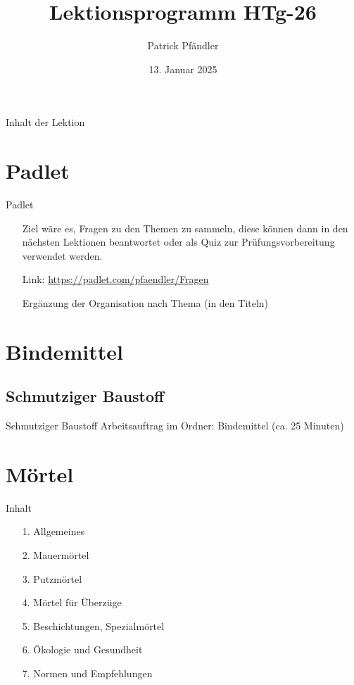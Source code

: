 



\title{\textbf{Lektionsprogramm HTg-26}}
\author{Patrick Pfändler}
\date{13. Januar 2025}




\frame{\titlepage}

\begin{frame}{Inhalt der Lektion}
    \tableofcontents
\end{frame}


\section{Padlet}
\BlueSectionSlide
\begin{frame}{Padlet}
    \begin{itemize}
        \item[\textbullet] Ziel wäre es, Fragen zu den Themen zu sammeln, diese können dann in den nächsten Lektionen beantwortet oder als Quiz zur Prüfungsvorbereitung verwendet werden.
        \item[\textbullet] Link: \url{https://padlet.com/pfaendler/Fragen}
        \item[\textbullet] Ergänzung der Organisation nach Thema (in den Titeln)
    \end{itemize}
\end{frame}

\section{Bindemittel}
\subsection{Schmutziger Baustoff}
\begin{frame}{Schmutziger Baustoff}
    Arbeitsauftrag im Ordner: Bindemittel (ca. 25 Minuten)
\end{frame}


\section{Mörtel}
\BlueSectionSlide

\begin{frame}{Inhalt}
    \begin{itemize}
        \item [1.] Allgemeines
        \item [2.] Mauermörtel
        \item [3.] Putzmörtel
        \item [4.] Mörtel für Überzüge
        \item [5.] Beschichtungen, Spezialmörtel
        \item [6.] Ökologie und Gesundheit
        \item [7.] Normen und Empfehlungen  
    \end{itemize}

\end{frame}

